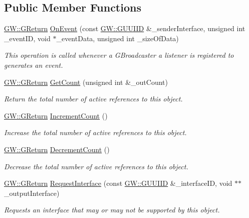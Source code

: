 \subsection*{Public Member Functions}
\begin{DoxyCompactItemize}
\item 
\hyperlink{namespaceGW_a67a839e3df7ea8a5c5686613a7a3de21}{G\+W\+::\+G\+Return} \hyperlink{classGBufferedInputTestListener_a72ad4efa12481df3cb87de61a58c0903}{On\+Event} (const \hyperlink{structGW_1_1GUUIID}{G\+W\+::\+G\+U\+U\+I\+ID} \&\+\_\+sender\+Interface, unsigned int \+\_\+event\+ID, void $\ast$\+\_\+event\+Data, unsigned int \+\_\+size\+Of\+Data)
\begin{DoxyCompactList}\small\item\em This operation is called whenever a G\+Broadcaster a listener is registered to generates an event. \end{DoxyCompactList}\item 
\hyperlink{namespaceGW_a67a839e3df7ea8a5c5686613a7a3de21}{G\+W\+::\+G\+Return} \hyperlink{classGBufferedInputTestListener_a91b6ab9254bc3886b42ca021ff6b4acd}{Get\+Count} (unsigned int \&\+\_\+out\+Count)
\begin{DoxyCompactList}\small\item\em Return the total number of active references to this object. \end{DoxyCompactList}\item 
\hyperlink{namespaceGW_a67a839e3df7ea8a5c5686613a7a3de21}{G\+W\+::\+G\+Return} \hyperlink{classGBufferedInputTestListener_af3a9ea97e6ab7d5350a4090aae43c471}{Increment\+Count} ()
\begin{DoxyCompactList}\small\item\em Increase the total number of active references to this object. \end{DoxyCompactList}\item 
\hyperlink{namespaceGW_a67a839e3df7ea8a5c5686613a7a3de21}{G\+W\+::\+G\+Return} \hyperlink{classGBufferedInputTestListener_a283260f6f72cfcbcc4e65c1e0635f789}{Decrement\+Count} ()
\begin{DoxyCompactList}\small\item\em Decrease the total number of active references to this object. \end{DoxyCompactList}\item 
\hyperlink{namespaceGW_a67a839e3df7ea8a5c5686613a7a3de21}{G\+W\+::\+G\+Return} \hyperlink{classGBufferedInputTestListener_ad3ed9fa46132f9b81651af2fde31eee6}{Request\+Interface} (const \hyperlink{structGW_1_1GUUIID}{G\+W\+::\+G\+U\+U\+I\+ID} \&\+\_\+interface\+ID, void $\ast$$\ast$\+\_\+output\+Interface)
\begin{DoxyCompactList}\small\item\em Requests an interface that may or may not be supported by this object. \end{DoxyCompactList}\end{DoxyCompactItemize}


